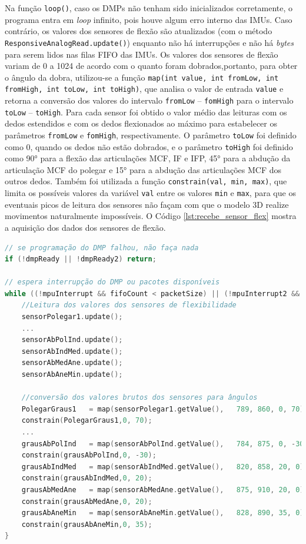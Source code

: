 Na função \lstinline!loop()!, caso os \ac{DMP}s não tenham sido inicializados corretamente, o programa entra em \textit{loop} infinito, pois houve algum erro interno das \ac{IMU}s. Caso contrário, os valores dos sensores de flexão são atualizados (com o método \lstinline!ResponsiveAnalogRead.update()!) enquanto não há interrupções e não há \textit{bytes} para serem lidos nas filas \ac{FIFO} das \ac{IMU}s. Os valores dos sensores de flexão variam de 0 a 1024 de acordo com o quanto foram dobrados,portanto, para obter o ângulo da dobra, utilizou-se a função \lstinline!map(int value, int fromLow, int fromHigh, int toLow, int toHigh)!, que analisa o valor de entrada \lstinline!value! e retorna a conversão dos valores do intervalo \lstinline!fromLow! -- \lstinline!fomHigh! para o intervalo \lstinline!toLow! -- \lstinline!toHigh!. Para cada sensor foi obtido o valor médio das leituras com os dedos estendidos e com os dedos flexionados ao máximo para estabelecer os parâmetros \lstinline!fromLow! e \lstinline!fomHigh!, respectivamente. O parâmetro \lstinline!toLow! foi definido como 0, quando os dedos não estão dobrados, e o parâmetro \lstinline!toHigh! foi definido como \ang{90} para a flexão das articulações \ac{MCF}, \ac{IF} e \ac{IFP}, \ang{45} para a abdução da articulação \ac{MCF} do polegar e \ang{15} para a abdução das articulações \ac{MCF} dos outros dedos. Também foi utilizada a função \lstinline!constrain(val, min, max)!, que limita os possíveis valores da variável \lstinline!val! entre os valores \lstinline!min! e \lstinline!max!, para que os eventuais picos de leitura dos sensores não façam com que o modelo \ac{3D} realize movimentos naturalmente impossíveis. O Código \ref{lst:recebe_sensor_flex} mostra a aquisição dos dados dos sensores de flexão.

\begin{lstlisting}[language=C++,label=lst:recebe_sensor_flex,caption={Leitura dos sensores de flexão},morekeywords={ResponsiveAnalogRead,MPU9250,delay,Serial,begin,println,print,attachInterrupt,pinMode}]
// se programação do DMP falhou, não faça nada
if (!dmpReady || !dmpReady2) return;

// espera interrupção do DMP ou pacotes disponíveis
while ((!mpuInterrupt && fifoCount < packetSize) || (!mpuInterrupt2 && fifoCount2 < packetSize2)) {
    //Leitura dos valores dos sensores de flexibilidade
    sensorPolegar1.update();
    ...
    sensorAbPolInd.update();
    sensorAbIndMed.update();
    sensorAbMedAne.update();
    sensorAbAneMin.update();
    
    //conversão dos valores brutos dos sensores para ângulos
    PolegarGraus1   = map(sensorPolegar1.getValue(),   789, 860, 0, 70);
    constrain(PolegarGraus1,0, 70);
    ...
    grausAbPolInd   = map(sensorAbPolInd.getValue(),   784, 875, 0, -30);
    constrain(grausAbPolInd,0, -30);
    grausAbIndMed   = map(sensorAbIndMed.getValue(),   820, 858, 20, 0);
    constrain(grausAbIndMed,0, 20);
    grausAbMedAne   = map(sensorAbMedAne.getValue(),   875, 910, 20, 0);
    constrain(grausAbMedAne,0, 20);
    grausAbAneMin   = map(sensorAbAneMin.getValue(),   828, 890, 35, 0);
    constrain(grausAbAneMin,0, 35);
}

\end{lstlisting}

